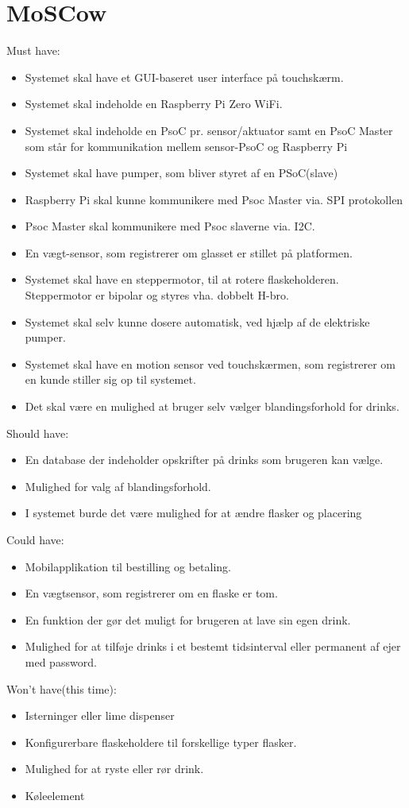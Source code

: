\section{MoSCow}
Must have:
\begin{itemize}
    \item Systemet skal have et GUI-baseret user interface på touchskærm.
    \item Systemet skal indeholde en Raspberry Pi Zero WiFi.
    \item Systemet skal indeholde en PsoC pr. sensor/aktuator samt en PsoC Master som står for kommunikation mellem sensor-PsoC og Raspberry Pi
    \item Systemet skal have pumper, som bliver styret af en PSoC(slave)
    \item Raspberry Pi skal kunne kommunikere med Psoc Master via. SPI protokollen
    \item Psoc Master skal kommunikere med Psoc slaverne via. I2C.
    \item En vægt-sensor, som registrerer om glasset er stillet på platformen. 
    \item Systemet skal have en steppermotor, til at rotere flaskeholderen. Steppermotor er bipolar og styres vha. dobbelt H-bro. 
    \item Systemet skal selv kunne dosere automatisk, ved hjælp af de elektriske pumper.
    \item Systemet skal have en motion sensor ved touchskærmen, som registrerer om en kunde stiller sig op til systemet.
    \item Det skal være en mulighed at bruger selv vælger blandingsforhold for drinks.
\end{itemize}
Should have:
\begin{itemize}
    \item En database der indeholder opskrifter på drinks som brugeren kan vælge.
    \item Mulighed for valg af blandingsforhold.
    \item I systemet burde det være mulighed for at ændre flasker og placering
\end{itemize}
Could have:
\begin{itemize}
    \item Mobilapplikation til bestilling og betaling.
    \item En vægtsensor, som registrerer om en flaske er tom.
    \item En funktion der gør det muligt for brugeren at lave sin egen drink.
    \item Mulighed for at tilføje drinks i et bestemt tidsinterval eller permanent af ejer med password.
\end{itemize}
Won’t have(this time): 
\begin{itemize}
    \item Isterninger eller lime dispenser
    \item Konfigurerbare flaskeholdere til forskellige typer flasker.
    \item Mulighed for at ryste eller rør drink.
    \item Køleelement
\end{itemize}

